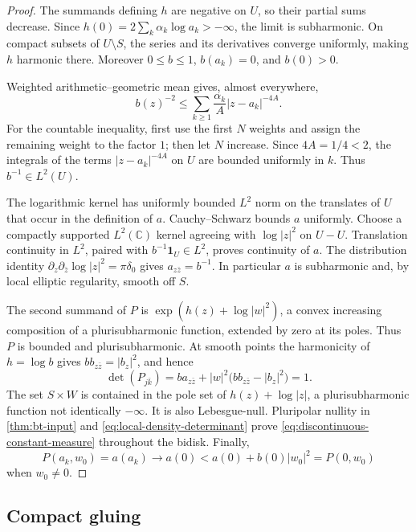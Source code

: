 \begin{proof}
The summands defining $h$ are negative on $U$, so their partial sums decrease. Since $h(0)=2\sum_k\alpha_k\log a_k> -\infty$, the limit is subharmonic. On compact subsets of $U\setminus S$, the series and its derivatives converge uniformly, making $h$ harmonic there. Moreover $0\leq b\leq1$, $b(a_k)=0$, and $b(0)>0$.

Weighted arithmetic--geometric mean gives, almost everywhere,
\begin{equation}\label{eq:polar-reciprocal-integrability}
 b(z)^{-2}\leq\sum_{k\geq1}\frac{\alpha_k}{A}|z-a_k|^{-4A}.
\end{equation}
For the countable inequality, first use the first $N$ weights and assign the remaining weight to the factor $1$; then let $N$ increase. Since $4A=1/4<2$, the integrals of the terms $|z-a_k|^{-4A}$ on $U$ are bounded uniformly in $k$. Thus $b^{-1}\in L^2(U)$.

The logarithmic kernel has uniformly bounded $L^2$ norm on the translates of $U$ that occur in the definition of $a$. Cauchy--Schwarz bounds $a$ uniformly. Choose a compactly supported $L^2(\mathbb C)$ kernel agreeing with $\log|z|^2$ on $U-U$. Translation continuity in $L^2$, paired with $b^{-1}\mathbf1_U\in L^2$, proves continuity of $a$. The distribution identity $\partial_z\partial_{\bar z}\log|z|^2=\pi\delta_0$ gives $a_{z\bar z}=b^{-1}$. In particular $a$ is subharmonic and, by local elliptic regularity, smooth off $S$.

The second summand of $P$ is $\exp(h(z)+\log|w|^2)$, a convex increasing composition of a plurisubharmonic function, extended by zero at its poles. Thus $P$ is bounded and plurisubharmonic. At smooth points the harmonicity of $h=\log b$ gives $bb_{z\bar z}=|b_z|^2$, and hence
\[
 \det(P_{j\bar k})
 =ba_{z\bar z}+|w|^2\bigl(bb_{z\bar z}-|b_z|^2\bigr)=1.
\]
The set $S\times W$ is contained in the pole set of $h(z)+\log|z|$, a plurisubharmonic function not identically $-\infty$. It is also Lebesgue-null. Pluripolar nullity in \cref{thm:bt-input} and \eqref{eq:local-density-determinant} prove \eqref{eq:discontinuous-constant-measure} throughout the bidisk. Finally,
\[
 P(a_k,w_0)=a(a_k)\longrightarrow a(0)
 <a(0)+b(0)|w_0|^2=P(0,w_0)
\]
when $w_0\ne0$.
\end{proof}

\subsection{Compact gluing}

